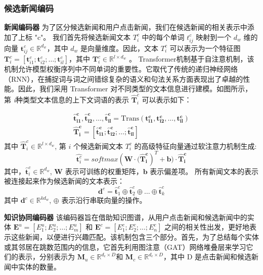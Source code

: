 \documentclass[withoutpreface,bwprint]{cumcmthesis} %
\begin{document}
	\subsubsection{ 候选新闻编码}
	\textbf{新闻编码器 } 
	为了区分候选新闻和用户点击新闻，我们在候选新闻的相关表示中添加了上标 "c"。
	我们首先将候选新闻文本 $T_i^c$ 中的每个单词 $t^c_{ij}$ 映射到一个 $d_w$ 维的向量 $\mathbf{t}_{ij}^c \in \mathbb{R}^{d_w}$，其中 $d_w$ 是向量维度。因此，文本 $T_i^c$ 可以表示为一个特征图 $\mathbf{T}_i^c = [\mathbf{t}_{i1}^c; \mathbf{t}_{i2}^c; \dots; \mathbf{t}_{il}^c]$，其中 $\mathbf{T}_i^c \in \mathbb{R}^{l \times d_w}$ 。
	Transformer机制基于自注意机制，该机制允许模型权衡序列中不同单词的重要性。它取代了传统的递归神经网络（RNN），在捕捉词与词之间错综复杂的语义和句法关系方面表现出了卓越的性能。因此，我们采用 Transformer 对不同类型的文本信息进行建模。如图所示，第 \textit{i}种类型文本信息的上下文词语的表示 $\hat{\mathbf{T}}_i^c$ 可以表示如下：
	
	\begin{equation}\label{eta}
	\mathbf{\begin{split}
	\hat{\mathbf{t}} _{i1}^{c}, \hat{\mathbf{t}}_{i2}^{c}, \ldots, \hat{\mathbf{t}}_{il}^{c} =\mathrm{Trans} (\mathbf{t}^c_{i1},\mathbf{t}^c_{i2}, \ldots, \mathbf{t}^c_{il})\\
	\hat{\mathbf{T}}_i^c = [\hat{\mathbf{t}}_{i1}^{c}; \hat{\mathbf{t}}_{i2}^{c}; \ldots; \hat{\mathbf{t}}_{il}^{c}]
	\end{split}}
	\end{equation}\label{eta}
	其中 $\hat{\mathbf{T}}^{c}_i \in \mathbb{R}^{l \times d_w}$, 
	第 $i$ 个候选新闻文本 $T_i^c$ 的高级特征向量通过软注意力机制生成: 
	\begin{equation}
	\hat{\mathbf{t}^c_i} = softmax( \mathbf{W} \cdot \mathbf{(\hat{\mathbf{T}}^c_i})^{T} + \mathbf{b}) \cdot \mathbf{\hat{\mathbf{T}}^c_i}
	\end{equation}
	其中，$\hat{\mathbf{t}}^c_i \in \mathbb{R}^{d_w}$, $\mathbf{W}$ 表示可训练的权重矩阵，$\mathbf{b}$ 表示偏差项。
	所有新闻文本的表示被连接起来作为候选新闻的文本表示：
	\begin{equation}\label{eta}
	\mathbf{d}^c= \hat{\mathbf{t}}_1^c \oplus \hat{\mathbf{t}}_2^c \oplus \ldots \oplus \hat{\mathbf{t}}_k^c
	\end{equation}\label{eta}
	其中 $\mathbf{d}^c \in \mathbb{R}^{kd_w}$, $\oplus$ 表示沿行串联向量的操作。\par
	\textbf{知识协同编码器 }
	该编码器旨在借助知识图谱，从用户点击新闻和候选新闻中的实体 $\mathbf{E}^{u} =[E^u_1;E^u_2;\dots;E^u_m] $ 和 $\mathbf{E}^{c} = [E^c_1;E^c_2;\dots;E^c_n] $ 之间的相关性出发，更好地表示这些新闻，以便进行兴趣匹配。该机制包含三个部分。首先，为了总结每个实体或其邻居在跳数范围内的信息，它首先利用图注意（GAT）网络堆叠层来学习它们的表示，分别表示为 $\mathbf{M}_u \in \mathbb{R}^{d_e \times D}$和 $\mathbf{M}_c \in \mathbb{R}^{d_e \times D}$，其中 D 是点击新闻和候选新闻中实体的数量。
	
\end{document}
